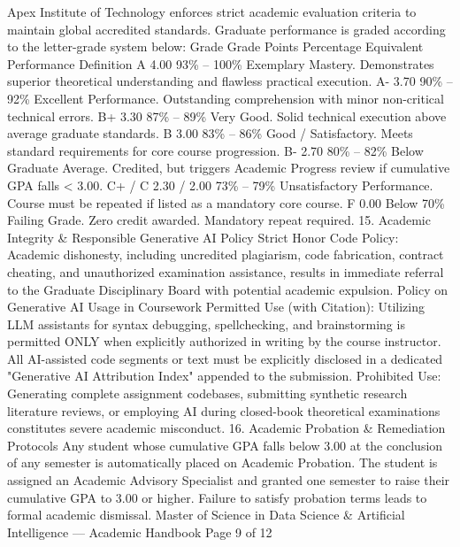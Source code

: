Apex Institute of Technology enforces strict academic evaluation criteria to maintain global accredited standards.
Graduate performance is graded according to the letter-grade system below:
Grade
Grade
Points
Percentage
Equivalent
Performance Definition
A
4.00
93\% – 100\%
Exemplary Mastery. Demonstrates superior theoretical understanding and
flawless practical execution.
A-
3.70
90\% – 92\%
Excellent Performance. Outstanding comprehension with minor non-critical
technical errors.
B+
3.30
87\% – 89\%
Very Good. Solid technical execution above average graduate standards.
B
3.00
83\% – 86\%
Good / Satisfactory. Meets standard requirements for core course progression.
B-
2.70
80\% – 82\%
Below Graduate Average. Credited, but triggers Academic Progress review if
cumulative GPA falls < 3.00.
C+ /
C
2.30 / 2.00
73\% – 79\%
Unsatisfactory Performance. Course must be repeated if listed as a mandatory
core course.
F
0.00
Below 70\%
Failing Grade. Zero credit awarded. Mandatory repeat required.
15. Academic Integrity \& Responsible Generative AI Policy
Strict Honor Code Policy: Academic dishonesty, including uncredited plagiarism, code fabrication, contract
cheating, and unauthorized examination assistance, results in immediate referral to the Graduate Disciplinary
Board with potential academic expulsion.
Policy on Generative AI Usage in Coursework
Permitted Use (with Citation): Utilizing LLM assistants for syntax debugging, spellchecking, and brainstorming is
permitted ONLY when explicitly authorized in writing by the course instructor. All AI-assisted code segments or text must
be explicitly disclosed in a dedicated "Generative AI Attribution Index" appended to the submission.
Prohibited Use: Generating complete assignment codebases, submitting synthetic research literature reviews, or
employing AI during closed-book theoretical examinations constitutes severe academic misconduct.
16. Academic Probation \& Remediation Protocols
Any student whose cumulative GPA falls below 3.00 at the conclusion of any semester is automatically placed on
Academic Probation. The student is assigned an Academic Advisory Specialist and granted one semester to raise
their cumulative GPA to 3.00 or higher. Failure to satisfy probation terms leads to formal academic dismissal.
Master of Science in Data Science \& Artificial Intelligence — Academic Handbook
Page 9 of 12

